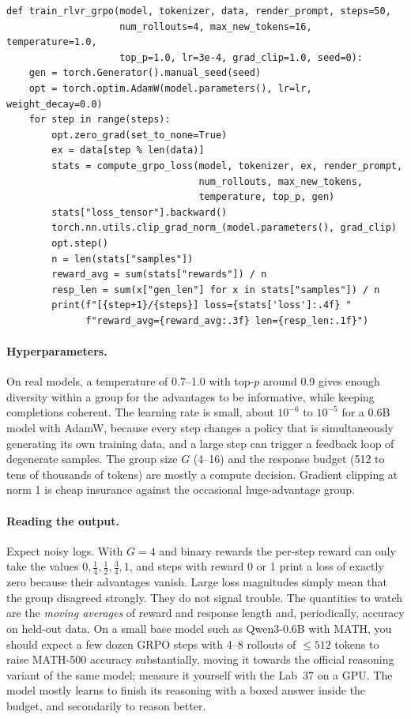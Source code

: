 \begin{lstlisting}[caption={The training loop (abridged from \texttt{train\_rlvr\_grpo}; CSV logging and checkpointing elided).},label={lst:grpo:loop}]
def train_rlvr_grpo(model, tokenizer, data, render_prompt, steps=50,
                    num_rollouts=4, max_new_tokens=16, temperature=1.0,
                    top_p=1.0, lr=3e-4, grad_clip=1.0, seed=0):
    gen = torch.Generator().manual_seed(seed)
    opt = torch.optim.AdamW(model.parameters(), lr=lr, weight_decay=0.0)
    for step in range(steps):
        opt.zero_grad(set_to_none=True)
        ex = data[step % len(data)]
        stats = compute_grpo_loss(model, tokenizer, ex, render_prompt,
                                  num_rollouts, max_new_tokens,
                                  temperature, top_p, gen)
        stats["loss_tensor"].backward()
        torch.nn.utils.clip_grad_norm_(model.parameters(), grad_clip)
        opt.step()
        n = len(stats["samples"])
        reward_avg = sum(stats["rewards"]) / n
        resp_len = sum(x["gen_len"] for x in stats["samples"]) / n
        print(f"[{step+1}/{steps}] loss={stats['loss']:.4f} "
              f"reward_avg={reward_avg:.3f} len={resp_len:.1f}")
\end{lstlisting}

\paragraph{Hyperparameters.} On real models, a temperature of 0.7--1.0 with top-$p$
around 0.9 gives enough diversity within a group for the advantages to be informative,
while keeping completions coherent. The learning rate is small, about $10^{-6}$ to
$10^{-5}$ for a 0.6B model with AdamW, because every step changes a policy that is
simultaneously generating its own training data, and a large step can trigger a feedback
loop of degenerate samples. The group size $G$ (4--16) and the response budget (512 to
tens of thousands of tokens) are mostly a compute decision. Gradient clipping at norm 1 is
cheap insurance against the occasional huge-advantage group.

\paragraph{Reading the output.} Expect noisy logs. With $G=4$ and binary rewards the
per-step reward can only take the values $0,\frac14,\frac12,\frac34,1$, and steps with
reward 0 or 1 print a loss of exactly zero because their advantages vanish. Large loss
magnitudes simply mean that the group disagreed strongly. They do not signal trouble. The
quantities to watch are the \emph{moving averages} of reward and response length and,
periodically, accuracy on held-out data. On a small base model such as Qwen3-0.6B with MATH, you should expect
a few dozen GRPO steps with 4--8 rollouts of $\le512$ tokens to raise MATH-500 accuracy
substantially, moving it towards the official reasoning variant of the same model; measure it
yourself with the Lab~37  on a GPU. The model mostly learns to finish its reasoning with a boxed
answer inside the budget, and secondarily to reason better.

